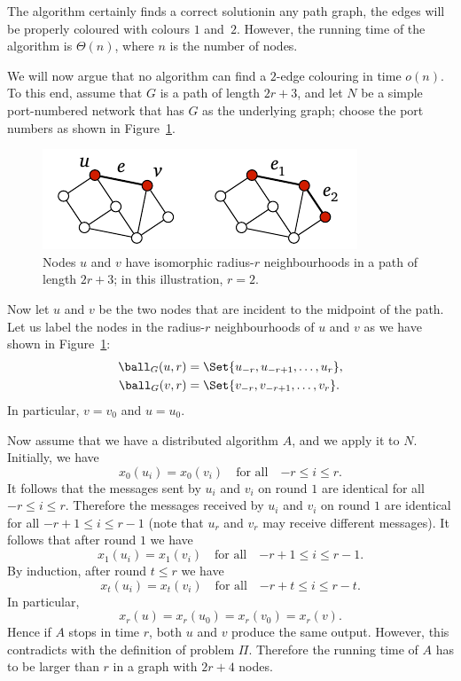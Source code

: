 The algorithm certainly finds a correct solution\mydash in any path graph, the edges will be properly coloured with colours $1$ and~$2$. However, the running time of the algorithm is $\Theta(n)$, where $n$ is the number of nodes.

We will now argue that no algorithm can find a $2$-edge colouring in time $o(n)$. To this end, assume that $G$ is a path of length $2r+3$, and let $N$ be a simple port-numbered network that has $G$ as the underlying graph; choose the port numbers as shown in Figure~\ref{fig:path-same-neigh}.

\begin{figure}
    \centering
    \includegraphics[page=\PPathSameNeigh]{figs.pdf}
    \caption{Nodes $u$ and $v$ have isomorphic radius-$r$ neighbourhoods in a path of length $2r+3$; in this illustration, $r = 2$.}\label{fig:path-same-neigh}
\end{figure}

Now let $u$ and $v$ be the two nodes that are incident to the midpoint of the path. Let us label the nodes in the radius-$r$ neighbourhoods of $u$ and $v$ as we have shown in Figure~\ref{fig:path-same-neigh}:
\begin{align*}
    \ball_G(u,r) &= \Set{u_{-r}, u_{-r+1}, \dotsc, u_r}, \\
    \ball_G(v,r) &= \Set{v_{-r}, v_{-r+1}, \dotsc, v_r}.
\end{align*}
In particular, $v = v_0$ and $u = u_0$.

Now assume that we have a distributed algorithm $A$, and we apply it to $N$. Initially, we have
\[
    x_0(u_i) = x_0(v_i) \quad \text{for all}\quad{-r} \le i \le r.
\]
It follows that the messages sent by $u_i$ and $v_i$ on round $1$ are identical for all $-r \le i \le r$. Therefore the messages received by $u_i$ and $v_i$ on round $1$ are identical for all $-r+1 \le i \le r-1$ (note that $u_r$ and $v_r$ may receive different messages). It follows that after round $1$ we have
\[
    x_1(u_i) = x_1(v_i) \quad \text{for all}\quad{-r+1} \le i \le r-1.
\]
By induction, after round $t \le r$ we have
\[
    x_t(u_i) = x_t(v_i) \quad \text{for all}\quad{-r+t} \le i \le r-t.
\]
In particular,
\[
    x_r(u) = x_r(u_0) = x_r(v_0) = x_r(v).
\]
Hence if $A$ stops in time $r$, both $u$ and $v$ produce the same output. However, this contradicts with the definition of problem $\Pi$. Therefore the running time of $A$ has to be larger than $r$ in a graph with $2r+4$ nodes.

